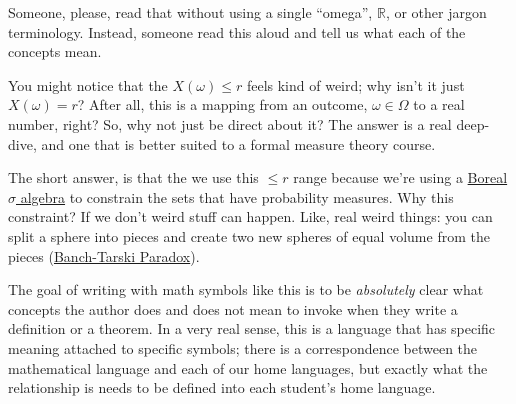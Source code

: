\documentclass[
  letterpaper,
  DIV=11,
  numbers=noendperiod]{scrreprt}
\begin{document}
Someone, please, read that without using a single ``omega'',
\(\mathbb{R}\), or other jargon terminology. Instead, someone read this
aloud and tell us what each of the concepts mean.

\begin{tcolorbox}[enhanced jigsaw, titlerule=0mm, opacitybacktitle=0.6, colframe=quarto-callout-note-color-frame, bottomrule=.15mm, leftrule=.75mm, breakable, bottomtitle=1mm, coltitle=black, toptitle=1mm, colback=white, opacityback=0, arc=.35mm, left=2mm, rightrule=.15mm, toprule=.15mm, title=\textcolor{quarto-callout-note-color}{\faInfo}\hspace{0.5em}{Note}, colbacktitle=quarto-callout-note-color!10!white]

You might notice that the \(X(\omega) \leq r\) feels kind of weird; why
isn't it just \(X(\omega) = r\)? After all, this is a mapping from an
outcome, \(\omega \in \Omega\) to a real number, right? So, why not just
be direct about it? The answer is a real deep-dive, and one that is
better suited to a formal measure theory course.

The short answer, is that the we use this \(\leq r\) range because we're
using a \href{https://en.wikipedia.org/wiki/Borel_set}{Boreal \(\sigma\)
algebra} to constrain the sets that have probability measures. Why this
constraint? If we don't weird stuff can happen. Like, real weird things:
you can split a sphere into pieces and create two new spheres of equal
volume from the pieces
(\href{https://en.wikipedia.org/wiki/Banach–Tarski_paradox}{Banch-Tarski
Paradox}).

\end{tcolorbox}

The goal of writing with math symbols like this is to be
\emph{absolutely} clear what concepts the author does and does not mean
to invoke when they write a definition or a theorem. In a very real
sense, this is a language that has specific meaning attached to specific
symbols; there is a correspondence between the mathematical language and
each of our home languages, but exactly what the relationship is needs
to be defined into each student's home language.
\end{document}
